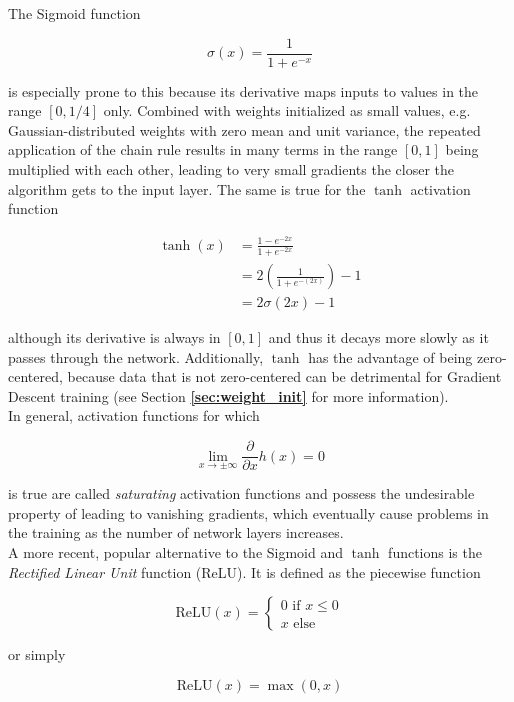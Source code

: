 The Sigmoid function

\[ \sigma(x) = \frac{1}{1 + e^{-x}} \]

\noindent is especially prone to this because its derivative maps inputs to values in the range $\left [0, 1/4 \right ]$ only. Combined with weights initialized as small values, e.g. Gaussian-distributed weights with zero mean and unit variance, the repeated application of the chain rule results in many terms in the range $\left [0, 1\right ]$ being multiplied with each other, leading to very small gradients the closer the algorithm gets to the input layer. The same is true for the $\tanh$ activation function

\begin {align}
	\tanh(x) &= \frac{1 - e^{-2x}}{1 + e^{-2x}}\\
		  &= 2 \left ( \frac{1}{1 + e^{-(2x)}} \right ) - 1\\
		  &= 2 \sigma(2x) - 1
\end {align}

\noindent although its derivative is always in $[0, 1]$ and thus it decays more slowly as it passes through the network. Additionally, $\tanh$ has the advantage of being zero-centered, because data that is not zero-centered can be detrimental for Gradient Descent training (see Section \textbf{\ref{sec:weight_init}} for more information).\\

In general, activation functions for which

\[ \lim \limits_{x \rightarrow \pm \infty} \frac{\partial}{\partial x} h(x) = 0 \label{eq:saturation} \]

\noindent is true are called \textit{saturating} activation functions and possess the undesirable property of leading to vanishing gradients, which eventually cause problems in the training as the number of network layers increases.\\ 

\noindent A more recent, popular alternative to the Sigmoid and $\tanh$ functions is the \textit{Rectified Linear Unit} function (ReLU). It is defined as the piecewise function

\[  \text{ReLU}(x) = \begin{cases}
			0 \text{ if } x \leq 0\\
			x \text{ else}
		 \end{cases}
\] 

\noindent or simply

\[ \text{ReLU}(x) = \max(0, x) \]

